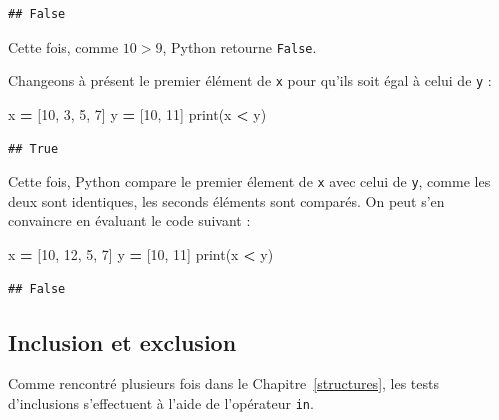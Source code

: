 \documentclass[12pt,]{book}
\newenvironment{Shaded}{\begin{snugshade}}{\end{snugshade}}
\newcommand{\DecValTok}[1]{\textcolor[rgb]{0.00,0.00,0.81}{#1}}
\newcommand{\OperatorTok}[1]{\textcolor[rgb]{0.81,0.36,0.00}{\textbf{#1}}}
\newcommand{\BuiltInTok}[1]{#1}
\newcommand{\NormalTok}[1]{#1}
\numberwithin{equation}{section}
\numberwithin{countremarque}{section}
\begin{document}
\begin{lstlisting}
## False
\end{lstlisting}

Cette fois, comme \(10>9\), Python retourne \texttt{False}.

Changeons à présent le premier élément de \texttt{x} pour qu'ils soit
égal à celui de \texttt{y} :

\begin{Shaded}
\begin{Highlighting}[]
\NormalTok{x }\OperatorTok{=}\NormalTok{ [}\DecValTok{10}\NormalTok{, }\DecValTok{3}\NormalTok{, }\DecValTok{5}\NormalTok{, }\DecValTok{7}\NormalTok{]}
\NormalTok{y }\OperatorTok{=}\NormalTok{ [}\DecValTok{10}\NormalTok{, }\DecValTok{11}\NormalTok{]}
\BuiltInTok{print}\NormalTok{(x }\OperatorTok{<}\NormalTok{ y)}
\end{Highlighting}
\end{Shaded}

\begin{lstlisting}
## True
\end{lstlisting}

Cette fois, Python compare le premier élement de \texttt{x} avec celui
de \texttt{y}, comme les deux sont identiques, les seconds éléments sont
comparés. On peut s'en convaincre en évaluant le code suivant :

\begin{Shaded}
\begin{Highlighting}[]
\NormalTok{x }\OperatorTok{=}\NormalTok{ [}\DecValTok{10}\NormalTok{, }\DecValTok{12}\NormalTok{, }\DecValTok{5}\NormalTok{, }\DecValTok{7}\NormalTok{]}
\NormalTok{y }\OperatorTok{=}\NormalTok{ [}\DecValTok{10}\NormalTok{, }\DecValTok{11}\NormalTok{]}
\BuiltInTok{print}\NormalTok{(x }\OperatorTok{<}\NormalTok{ y)}
\end{Highlighting}
\end{Shaded}

\begin{lstlisting}
## False
\end{lstlisting}

\subsection{Inclusion et exclusion}\label{inclusion-et-exclusion}

Comme rencontré plusieurs fois dans le Chapitre~\ref{structures}, les
tests d'inclusions s'effectuent à l'aide de l'opérateur \texttt{in}.
\end{document}
